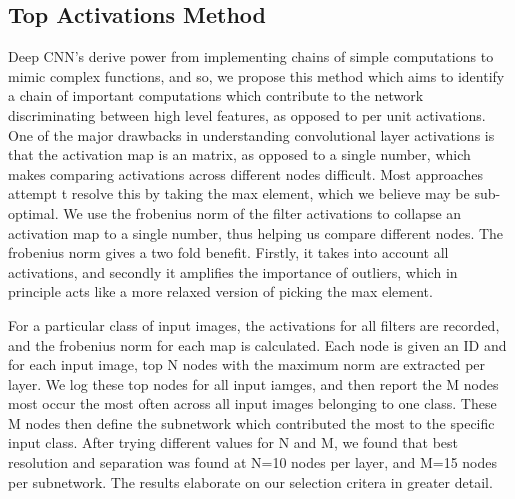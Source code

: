 \documentclass[10pt,twocolumn,letterpaper]{article}
\begin{document}
\subsection{Top Activations Method}
Deep CNN's derive power from implementing chains of simple computations to mimic complex functions, and so, we propose this method which aims to identify a chain of important computations which contribute to the network discriminating between high level features, as opposed to per unit activations. One of the major drawbacks in understanding convolutional layer activations is that the activation map is an matrix, as opposed to a single number, which makes comparing activations across different nodes difficult. Most approaches attempt t resolve this by taking the max element, which we believe may be sub-optimal. We use the frobenius norm of the filter activations to collapse an activation map to a single number, thus helping us compare different nodes. The frobenius norm gives a two fold benefit. Firstly, it takes into account all activations, and secondly it amplifies the importance of outliers, which in principle acts like a more relaxed version of picking the max element. 

For a particular class of input images, the activations for all filters are recorded, and the frobenius norm for each map is calculated. Each node is given an ID and for each input image, top N nodes with the maximum norm are extracted per layer. We log these top nodes for all input iamges, and then report the M nodes most occur the most often across all input images belonging to one class. These M nodes then define the subnetwork which contributed the most to the specific input class. After trying different values for N and M, we found that best resolution and separation was found at N=10 nodes per layer, and M=15 nodes per subnetwork. The results elaborate on our selection critera in greater detail.
\end{document}
